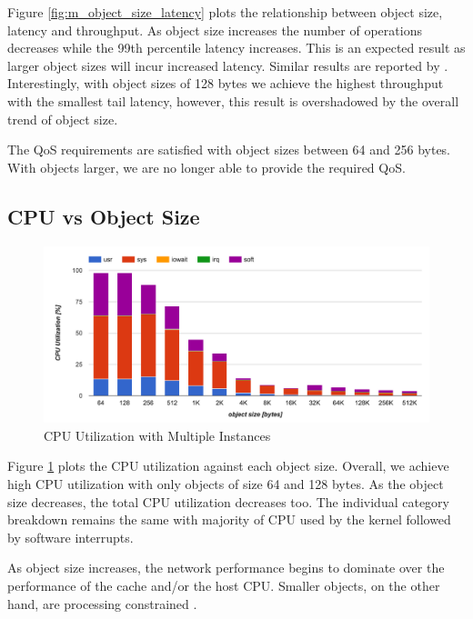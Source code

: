 Figure \ref{fig:m_object_size_latency} plots the relationship between object size, latency and throughput. As object size increases the number of operations decreases while the 99th percentile latency increases. This is an expected result as larger object sizes will incur increased latency. Similar results are reported by \cite{lim2013thin}. Interestingly, with object sizes of 128 bytes we achieve the highest throughput with the smallest tail latency, however, this result is overshadowed by the overall trend of object size.

The QoS requirements are satisfied with object sizes between 64 and 256 bytes. With objects larger, we are no longer able to provide the required QoS.


\subsection{CPU vs Object Size}

\begin{figure}[h]
    \includegraphics[width=\textwidth]{./res2/m_object_size_cpu.png}
    \caption{CPU Utilization with Multiple Instances}
    \label{fig:m_object_size_cpu}
\end{figure}

Figure \ref{fig:m_object_size_cpu} plots the CPU utilization against each object size. Overall, we achieve high CPU utilization with only objects of size 64 and 128 bytes. As the object size decreases, the total CPU utilization decreases too. The individual category breakdown remains the same with majority of CPU used by the kernel followed by software interrupts.

As object size increases, the network performance begins to dominate over the performance of the cache and/or the host CPU. Smaller objects, on the other hand, are processing constrained \cite{lim2013thin}.

